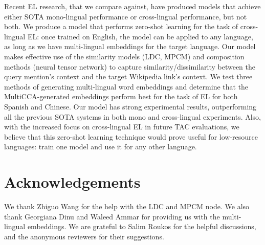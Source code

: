\documentclass[letterpaper]{article} \usepackage{aaai18}  \usepackage{times}  \usepackage{helvet}  \usepackage{courier}  \usepackage{url}  \usepackage{graphicx}  \frenchspacing  \setlength{\pdfpagewidth}{8.5in}  \setlength{\pdfpageheight}{11in}  \usepackage{latexsym}
\begin{document}
\label{sec:conclusion}
Recent EL research, that we compare against, have produced models that achieve either SOTA mono-lingual performance or cross-lingual performance, but not both. We produce a model that performs zero-shot learning for the task of cross-lingual EL: once trained on English, the model can be applied to any language, as long as we have multi-lingual embeddings for the target language. Our model makes effective use of the similarity models (LDC, MPCM) and composition methods (neural tensor network) to capture similarity/dissimilarity between the query mention's context and the target Wikipedia link's context. We test three methods of generating multi-lingual word embeddings and determine that the MultiCCA-generated embeddings perform best for the task of EL for both Spanish and Chinese. Our model has strong experimental results, outperforming all the previous SOTA systems in both mono and cross-lingual experiments. Also, with the increased focus on cross-lingual EL in future TAC evaluations, we believe that this zero-shot learning technique would prove useful for low-resource languages: train one model and use it for any other language.


\section{Acknowledgements}
We thank Zhiguo Wang for the help with the LDC and MPCM node. We also thank Georgiana Dinu and Waleed Ammar for providing us with the multi-lingual embeddings. We are grateful to Salim Roukos for the helpful discussions, and the anonymous reviewers for their suggestions.






\end{document}
